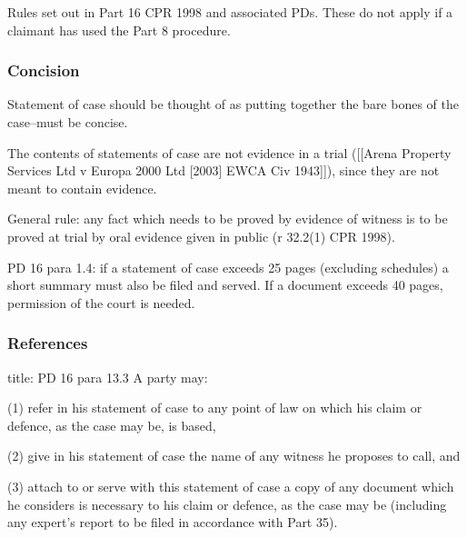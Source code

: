 \documentclass[
]{article}
\newenvironment{Shaded}{}{}
\newcommand{\NormalTok}[1]{#1}
\begin{document}
Rules set out in Part 16 CPR 1998 and associated PDs. These do not apply
if a claimant has used the Part 8 procedure.

\hypertarget{concision}{%
\subsubsection{Concision}\label{concision}}

Statement of case should be thought of as putting together the bare
bones of the case--must be concise.

The contents of statements of case are not evidence in a trial
({[}{[}Arena Property Services Ltd v Europa 2000 Ltd {[}2003{]} EWCA Civ
1943{]}{]}), since they are not meant to contain evidence.

General rule: any fact which needs to be proved by evidence of witness
is to be proved at trial by oral evidence given in public (r 32.2(1) CPR
1998).

PD 16 para 1.4: if a statement of case exceeds 25 pages (excluding
schedules) a short summary must also be filed and served. If a document
exceeds 40 pages, permission of the court is needed.

\hypertarget{references}{%
\subsubsection{References}\label{references}}

\begin{Shaded}
\begin{Highlighting}[]
\NormalTok{title: PD 16 para 13.3}
\NormalTok{A party may:}

\NormalTok{(1) refer in his statement of case to any point of law on which his claim or defence, as the case may be, is based,}

\NormalTok{(2) give in his statement of case the name of any witness he proposes to call, and}

\NormalTok{(3) attach to or serve with this statement of case a copy of any document which he considers is necessary to his claim or defence, as the case may be (including any expert’s report to be filed in accordance with Part 35).}
\end{Highlighting}
\end{Shaded}
\end{document}
